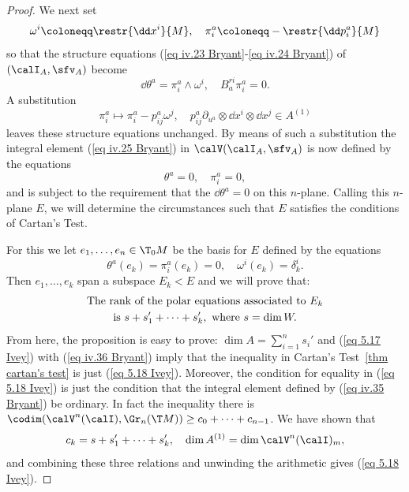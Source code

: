 \begin{proof}
    We next set 
    \[\omega^i\coloneqq \restr{\dd x^i}{M},\quad \pi^a_i\coloneqq -\restr{\dd p^a_i}{M}\]
    so that the structure equations (\ref{eq iv.23 Bryant}-\ref{eq iv.24 Bryant}) of $(\calI_A,\sfv_A)$ become 
    \[\dd \theta^a=\pi^a_i\wedge\omega^i,\quad B^{ri}_a\pi^a_i=0.\label{eq iv.34 Bryant}\]
    A substitution 
    \[\pi^a_i\mapsto \pi^a_i-p^a_{ij}\omega^j,\quad p^a_{ij}\partial_{u^a}\otimes \dd x^i\otimes \dd x^j\in A^{(1)}\]
    leaves these structure equations unchanged. By means of such a substitution the integral element (\ref{eq iv.25 Bryant}) in $\calV(\calI_A,\sfv_A)$ is now defined by the equations 
    \[\theta^a=0,\quad \pi^a_i=0,\label{eq iv.35 Bryant}\]
    and is subject to the requirement that the $\dd\theta^a=0$ on this $n$-plane. Calling this $n$-plane $E$, we will determine the circumstances such that $E$ satisfies the conditions of Cartan's Test.

    For this we let $e_1,\ldots,e_n\in\T_0 M$ be the basis for $E$ defined by the equations 
    \[\theta^a(e_k)=\pi^a_i(e_k)=0,\quad \omega^i(e_k)=\delta^i_k.\]
    Then $e_1,\ldots,e_k$ span a subspace $E_k<E$ and we will prove that:
    \begin{gather}
        \text{The rank of the polar equations associated to }E_k \notag\\ 
        \text{is }s+s_1'+\cdots+s_k',\text{ where }s=\dim W.\label{eq iv.36 Bryant}
    \end{gather}
    From here, the proposition is easy to prove: $\dim A=\sum_{i=1}^n s_i'$ and (\ref{eq 5.17 Ivey}) with (\ref{eq iv.36 Bryant}) imply that the inequality in Cartan's Test~\ref{thm cartan's test} is just (\ref{eq 5.18 Ivey}). Moreover, the condition for equality in (\ref{eq 5.18 Ivey}) is just the condition that the integral element defined by (\ref{eq iv.35 Bryant}) be ordinary. In fact the inequality there is $\codim(\calV^n(\calI),\Gr_n(\T M))\geq c_0+\cdots +c_{n-1}$. We have shown that 
    \[c_k=s+s'_1+\cdots+s'_k,\quad \dim A^{(1)}=\dim \calV^n(\calI)_m,\]
    and combining these three relations and unwinding the arithmetic gives (\ref{eq 5.18 Ivey}).


\end{proof}
